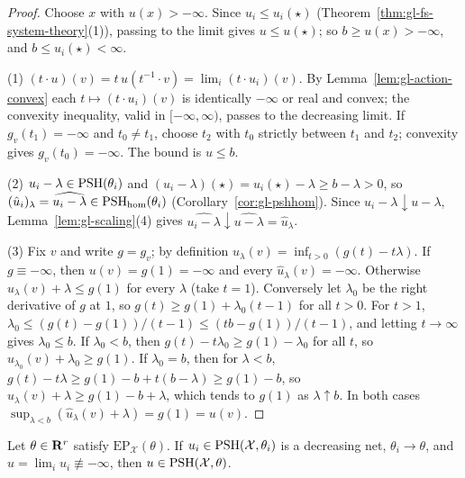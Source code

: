 \begin{proof}
Choose $x$ with $u(x)>-\infty$. Since $u_i\le u_i(\star)$ (Theorem~\ref{thm:gl-fs-system-theory}(1)), passing to the limit gives $u\le u(\star)$; so $b\ge u(x)>-\infty$, and
$b\le u_{i}(\star)<\infty$.

(1) $(t\cdot u)(v)=t\,u(t^{-1}\cdot v)=\lim_i(t\cdot u_i)(v)$. By Lemma~\ref{lem:gl-action-convex} each $t\mapsto(t\cdot u_i)(v)$ is identically $-\infty$ or real and
convex; the convexity inequality, valid in $[-\infty,\infty)$, passes to the decreasing limit. If $g_v(t_1)=-\infty$ and $t_0\ne t_1$, choose $t_2$ with $t_0$
strictly between $t_1$ and $t_2$; convexity gives $g_v(t_0)=-\infty$. The bound is $u\le b$.

(2) $u_i-\lambda\in\operatorname{PSH}(\theta_i)$ and $(u_i-\lambda)(\star)=u_i(\star)-\lambda\ge b-\lambda>0$, so $(\hat u_i)_\lambda=\widehat{u_i-\lambda}\in\operatorname{PSH}_{\mathrm{hom}}(\theta_i)$
(Corollary~\ref{cor:gl-pshhom}). Since $u_i-\lambda\downarrow u-\lambda$, Lemma~\ref{lem:gl-scaling}(4) gives $\widehat{u_i-\lambda}\downarrow\widehat{u-\lambda}=\hat u_\lambda$.

(3) Fix $v$ and write $g=g_v$; by definition $\hat u_\lambda(v)=\inf_{t>0}(g(t)-t\lambda)$. If $g\equiv-\infty$, then $u(v)=g(1)=-\infty$ and every
$\hat u_\lambda(v)=-\infty$. Otherwise $\hat u_\lambda(v)+\lambda\le g(1)$ for every $\lambda$ (take $t=1$). Conversely let $\lambda_0$ be the right derivative of $g$ at
$1$, so $g(t)\ge g(1)+\lambda_0(t-1)$ for all $t>0$. For $t>1$, $\lambda_0\le(g(t)-g(1))/(t-1)\le(tb-g(1))/(t-1)$, and letting $t\to\infty$ gives $\lambda_0\le b$. If
$\lambda_0<b$, then $g(t)-t\lambda_0\ge g(1)-\lambda_0$ for all $t$, so $\hat u_{\lambda_0}(v)+\lambda_0\ge g(1)$. If $\lambda_0=b$, then for $\lambda<b$,
$g(t)-t\lambda\ge g(1)-b+t(b-\lambda)\ge g(1)-b$, so $\hat u_\lambda(v)+\lambda\ge g(1)-b+\lambda$, which tends to $g(1)$ as $\lambda\uparrow b$. In both cases
$\sup_{\lambda<b}(\hat u_\lambda(v)+\lambda)=g(1)=u(v)$.
\end{proof}

\begin{theorem}\label{thm:nn-psh2-of-ep}
\leanok
{}
Let $\theta\in\mathbf{R}^r$ satisfy $\mathrm{EP}_{\mathcal X}(\theta)$. If $u_i\in\operatorname{PSH}(\mathcal X,\theta_i)$ is a decreasing net, $\theta_i\to\theta$, and $u=\lim_iu_i\not\equiv-\infty$,
then $u\in\operatorname{PSH}(\mathcal X,\theta)$.
\end{theorem}

